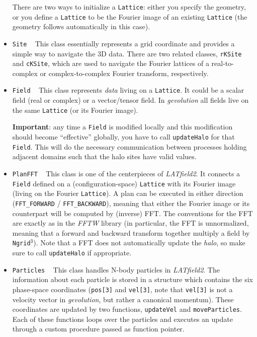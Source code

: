 \documentclass[a4paper,10pt]{article}
\begin{document}
\begin{itemize}
 There are two ways to initialize a \texttt{Lattice}: either you specify the geometry, or you define a \texttt{Lattice} to be the Fourier
 image of an existing \texttt{Lattice} (the geometry follows automatically in this case). 
 
 \item[] \hspace{-25pt}\texttt{Site} ~ This class essentially represents a grid coordinate and provides a simple way to navigate the 3D
 data. There are two related classes, \texttt{rKSite} and \texttt{cKSite}, which are used to navigate the Fourier lattices of a
 real-to-complex or complex-to-complex Fourier transform, respectively.
 
 \item[] \hspace{-25pt}\texttt{Field} ~ This class represents \textit{data} living on a \texttt{Lattice}. It could be a scalar field (real
 or complex) or a vector/tensor field. In \textit{gevolution} all fields live on the same \texttt{Lattice} (or its Fourier image).
 
 \textbf{Important}: any time a \texttt{Field} is modified locally and this modification should become ``effective'' globally, you have to
 call \texttt{updateHalo} for that \texttt{Field}. This will do the necessary communication between processes holding adjacent domains such
 that the halo sites have valid values.
 
 \item[] \hspace{-25pt}\texttt{PlanFFT} ~ This class is one of the centerpieces of \textit{LATfield2}. It connects a \texttt{Field} defined
 on a (configuration-space) \texttt{Lattice} with its Fourier image (living on the Fourier \texttt{Lattice}). A plan can be executed in
 either direction (\texttt{FFT\_FORWARD} / \texttt{FFT\_BACKWARD}), meaning that either the Fourier image or its counterpart will be
 computed by (inverse) FFT. The conventions for the FFT are exactly as in the \textit{FFTW} library (in particular, the FFT is unnormalized,
 meaning that a forward and backward transform together multiply a field by \texttt{Ngrid}$^\mathsf{3}$). Note that a FFT does not
 automatically update the \textit{halo}, so make sure to call \texttt{updateHalo} if appropriate.
 
 \item[] \hspace{-25pt}\texttt{Particles} ~ This class handles N-body particles in \textit{LATfield2}. The information about each particle
 is stored in a structure which contains the six phase-space coordinates (\texttt{pos[3]} and \texttt{vel[3]}, note that \texttt{vel[3]} is
 not a velocity vector in \textit{gevolution}, but rather a canonical momentum). These coordinates are updated by two functions,
 \texttt{updateVel} and \texttt{moveParticles}. Each of these functions loops over the particles and executes an update through a custom
 procedure passed as function pointer.
 

\end{itemize}
\end{document}
